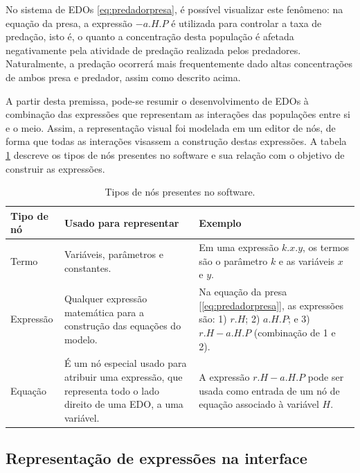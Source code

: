 \documentclass[
	12pt,				%
	openright,			%
	oneside,			%
	a4paper,			%
	main=brazil,
	english,			%
	]{ufsj-abntex2}
\begin{document}
No sistema de EDOs \ref{eq:predadorpresa}, é possível visualizar este fenômeno: na equação da presa, a expressão \(-a.H.P\) é utilizada para controlar a taxa de predação, isto é, o quanto a concentração desta população é afetada negativamente pela atividade de predação realizada pelos predadores. Naturalmente, a predação ocorrerá mais frequentemente dado altas concentrações de ambos presa e predador, assim como descrito acima.

A partir desta premissa, pode-se resumir o desenvolvimento de EDOs à combinação das expressões que representam as interações das populações entre si e o meio. Assim, a representação visual foi modelada em um editor de nós, de forma que todas as interações visassem a construção destas expressões. A tabela \ref{tab:tipos-de-nos} descreve os tipos de nós presentes no software e sua relação com o objetivo de construir as expressões.

\begin{table}
\begin{center}
\begin{tabular}{ |m{}|m{}|m{}| }
    \hline
    \rowcolor{lightgray} Tipo de nó & Usado para representar & Exemplo \\
    \hline
    Termo & Variáveis, parâmetros e constantes. & Em uma expressão \(k.x.y\), os termos são o parâmetro $k$ e as variáveis $x$ e $y$. \\
    \hline
    Expressão & Qualquer expressão matemática para a construção das equações do modelo. & Na equação da presa [\ref{eq:predadorpresa}], as expressões são: 1) \(r.H\); 2) \(a.H.P\); e 3) \(r.H - a.H.P\) (combinação de 1 e 2). \\
    \hline
    Equação & É um nó especial usado para atribuir uma expressão, que representa todo o lado direito de uma EDO, a uma variável. & A expressão \(r.H - a.H.P\) pode ser usada como entrada de um nó de equação associado à variável $H$. \\
    \hline 
\end{tabular}
\end{center}
\caption{Tipos de nós presentes no software.}
\label{tab:tipos-de-nos}
\end{table}

\subsection{Representação de expressões na interface}
\label{subsec:exprtree}
\end{document}
